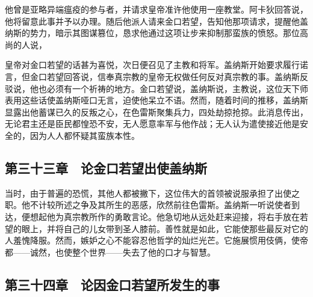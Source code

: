 他曾是亚略异端瘟疫的参与者，并请求皇帝准许他使用一座教堂。阿卡狄回答说，他将留意此事并予以办理。随后他派人请来金口若望，告知他那项请求，提醒他盖纳斯的势力，暗示其图谋篡位，恳求他通过这项让步来抑制那蛮族的愤怒。那位高尚的人说，\par

皇帝对金口若望的话甚为喜悦，次日便召见了主教和将军。盖纳斯开始要求履行诺言，但金口若望回答说，信奉真宗教的皇帝无权做任何反对真宗教的事。盖纳斯反驳说，他也必须有一个祈祷的地方。金口若望说，盖纳斯说，主教说，这位天下师表用这些话使盖纳斯哑口无言，迫使他呆立不语。然而，随着时间的推移，盖纳斯显露出他蓄谋已久的反叛之心，在色雷斯聚集兵力，四处劫掠抢掠。此消息传出，无论君主还是臣民都惶恐不安，无人愿意率军与他作战；无人认为遣使接近他是安全的，因为人人都怀疑其蛮族本性。\par


\subsection{第三十三章　论金口若望出使盖纳斯}

当时，由于普遍的恐慌，其他人都被撇下，这位伟大的首领被说服承担了出使之职。他不计较所述之争及其所生的恶感，欣然前往色雷斯。盖纳斯一听说使者到达，便想起他为真宗教所作的勇敢言论。他急切地从远处赶来迎接，将右手放在若望的眼上，并将自己的儿女带到圣人膝前。善性就是如此，它能使那些最反对它的人羞愧降服。然而，嫉妒之心不能容忍他哲学的灿烂光芒。它施展惯用伎俩，使帝都——诚然，也使整个世界——失去了他的口才与智慧。\par


\subsection{第三十四章　论因金口若望所发生的事}

